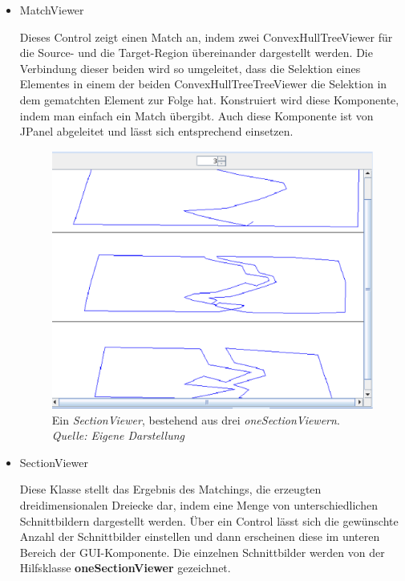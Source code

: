 \begin{itemize}
\item MatchViewer

Dieses Control zeigt einen Match an, indem zwei ConvexHullTreeViewer für die Source- und die Target-Region übereinander dargestellt werden. Die Verbindung dieser beiden wird so umgeleitet, dass die Selektion eines Elementes in einem der beiden ConvexHullTreeTreeViewer die Selektion in dem gematchten Element zur Folge hat. Konstruiert wird diese Komponente, indem man einfach ein Match übergibt. Auch diese Komponente ist von JPanel abgeleitet und lässt sich entsprechend einsetzen.

\begin{figure}
	\centering
	\includegraphics[scale=0.5]{Sectionviewer.eps}
	\caption[SectionViewer bestehend aus drei oneSectionViewern]{Ein \textit{SectionViewer}, bestehend aus drei \textit{oneSectionViewern}.\\\textit{Quelle: Eigene Darstellung}}
	\label{fig:SectionViewer}
\end{figure}


\item SectionViewer

Diese Klasse stellt das Ergebnis des Matchings, die erzeugten dreidimensionalen Dreiecke dar, indem eine Menge von unterschiedlichen Schnittbildern dargestellt werden. Über ein Control lässt sich die gewünschte Anzahl der Schnittbilder einstellen und dann erscheinen diese im unteren Bereich der GUI-Komponente. Die einzelnen Schnittbilder werden von der Hilfsklasse  \textbf{oneSectionViewer} gezeichnet.


\end{itemize}
